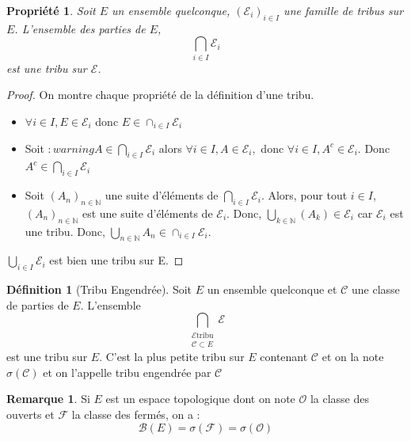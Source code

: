 \documentclass{article}[11pt]
\newtheorem{property}[theorem]{Propriété}
\theoremstyle{definition}
\newtheorem{definition}[theorem]{Définition}
\newtheorem{remarque}[theorem]{Remarque}
\begin{document}
\begin{property}\label{intersection_de_tribu}
  Soit $E$ un ensemble quelconque, $(\mathcal{E}_i)_{i \in I}$ une famille de tribus sur $E$.
  L'ensemble des parties de $E$, 
  \[\bigcap_{i \in I} \mathcal{E}_i\]
  est une tribu sur $\mathcal{E}$.
\end{property}
\begin{proof} On montre chaque propriété de la définition d'une tribu.

  \begin{itemize}
    \item $\forall i \in I, E \in \mathcal{E}_i $ donc $ E \in \cap_{i \in I}\mathcal{E}_i$
    \item Soit $:warningA \in \bigcap_{i \in I}\mathcal{E}_i $ alors $\forall i \in I, A \in \mathcal{E}_i,$ donc $\forall i \in I, A^c \in \mathcal{E}_i$.
      Donc $A^c \in \bigcap_{i \in I} \mathcal{E}_i$
    \item Soit $(A_n)_{n \in \mathbb{N}}$ une suite d'éléments de $\bigcap_{i \in I} \mathcal{E}_i$.\newline
      Alors, pour tout $i \in I$, $(A_n)_{n\in\mathbb{N}}$ est une suite d'éléments de $\mathcal{E}_i$.\newline
      Donc, $\bigcup_{k \in \mathbb{N}}(A_k) \in \mathcal{E}_i $ car $\mathcal{E}_i$ est une tribu. \newline
      Donc, $\bigcup_{n \in \mathbb{N}}A_n \in \cap_{i \in I} \mathcal{E}_i$.
  \end{itemize}
  $\bigcup_{i \in I} \mathcal{E}_i$ est bien une tribu sur E.
\end{proof}
\begin{definition}[Tribu Engendrée]\label{tribu_engendree}
  Soit $E$ un ensemble quelconque et $\mathcal{C}$ une classe de parties de $E$. L'ensemble $$\bigcap_{\substack{\mathcal{E} \text{tribu} \\ \mathcal{C} \subset E}}\mathcal{E}$$ est une tribu sur $E$.\newline
  C'est la plus petite tribu sur $E$ contenant $\mathcal{C}$ et on la note $\sigma(\mathcal{C})$ et on l'appelle tribu engendrée par $\mathcal{C}$
\end{definition}
\begin{remarque}\label{def_borelien}
  Si $E$ est un espace topologique dont on note $\mathcal{O}$ la classe des ouverts et $\mathcal{F}$ la classe des fermés, on a :
  $$\mathcal{B}(E) = \sigma(\mathcal{F}) = \sigma(\mathcal{O})$$
\end{remarque}
\end{document}
